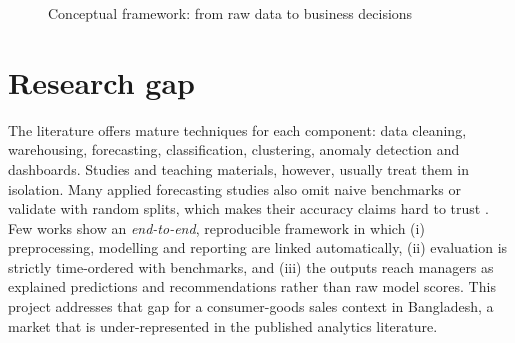 \begin{figure}[htbp]\centering
{}
\caption{Conceptual framework: from raw data to business decisions}\label{fig:conceptual}
\end{figure}

\section{Research gap}
The literature offers mature techniques for each component: data cleaning, warehousing, forecasting,
classification, clustering, anomaly detection and dashboards. Studies and teaching materials, however, usually
treat them in isolation. Many applied forecasting studies also omit naive benchmarks or validate with random
splits, which makes their accuracy claims hard to trust \citep{makridakis2018, kaufman2012}. Few works show an
\emph{end-to-end}, reproducible framework in which (i) preprocessing, modelling and reporting are linked
automatically, (ii) evaluation is strictly time-ordered with benchmarks, and (iii) the outputs reach managers as
explained predictions and recommendations rather than raw model scores. This project addresses that gap for a
consumer-goods sales context in Bangladesh, a market that is under-represented in the published analytics
literature.

